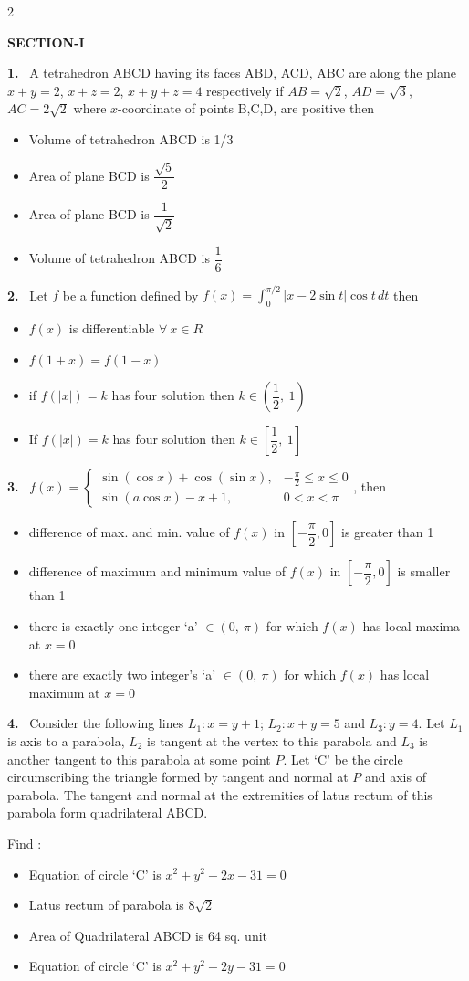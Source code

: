 \documentclass[10pt]{extarticle}
\newcommand{\partsec}[2]{\par\medskip\noindent{\large\bfseries PART-#1: #2}\par\smallskip}
\newcommand{\sect}[1]{\par\smallskip\noindent\textbf{#1}\par}
\newcommand{\qn}[1]{\par\smallskip\noindent\textbf{#1.}~}
\newenvironment{qoptions}{\begin{itemize}[leftmargin=1.8em,itemsep=1pt,topsep=2pt,label={}]}{\end{itemize}}
\newcommand{\opt}[2]{\item[(#1)] #2}
\begin{document}
\begin{multicols}{2}
\partsec{3}{MATHEMATICS}
\sect{SECTION-I}
\qn{1} A tetrahedron ABCD having its faces ABD, ACD, ABC are along the plane $x+y=2$, $x+z=2$, $x+y+z=4$ respectively if $AB=\sqrt2$, $AD=\sqrt3$, $AC=2\sqrt2$ where $x$-coordinate of points B,C,D, are positive then
\begin{qoptions}
\opt{A}{Volume of tetrahedron ABCD is 1/3}
\opt{B}{Area of plane BCD is $\dfrac{\sqrt5}{2}$}
\opt{C}{Area of plane BCD is $\dfrac{1}{\sqrt2}$}
\opt{D}{Volume of tetrahedron ABCD is $\dfrac16$}
\end{qoptions}

\qn{2} Let $f$ be a function defined by $f(x)=\displaystyle\int_0^{\pi/2}|x-2\sin t|\cos t\,dt$ then
\begin{qoptions}
\opt{A}{$f(x)$ is differentiable $\forall\ x\in R$}
\opt{B}{$f(1+x)=f(1-x)$}
\opt{C}{if $f(|x|)=k$ has four solution then $k\in\left(\dfrac12,\ 1\right)$}
\opt{D}{If $f(|x|)=k$ has four solution then $k\in\left[\dfrac12,\ 1\right]$}
\end{qoptions}

\qn{3} $f(x)=\begin{cases}\sin(\cos x)+\cos(\sin x), & -\frac{\pi}{2}\le x\le0\\ \sin(a\cos x)-x+1, & 0<x<\pi\end{cases}$, then
\begin{qoptions}
\opt{A}{difference of max. and min. value of $f(x)$ in $\left[-\dfrac{\pi}{2},0\right]$ is greater than 1}
\opt{B}{difference of maximum and minimum value of $f(x)$ in $\left[-\dfrac{\pi}{2},0\right]$ is smaller than 1}
\opt{C}{there is exactly one integer `a' $\in(0,\ \pi)$ for which $f(x)$ has local maxima at $x=0$}
\opt{D}{there are exactly two integer's `a' $\in(0,\ \pi)$ for which $f(x)$ has local maximum at $x=0$}
\end{qoptions}

\qn{4} Consider the following lines $L_1: x=y+1$; $L_2: x+y=5$ and $L_3: y=4$. Let $L_1$ is axis to a parabola, $L_2$ is tangent at the vertex to this parabola and $L_3$ is another tangent to this parabola at some point $P$. Let `C' be the circle circumscribing the triangle formed by tangent and normal at $P$ and axis of parabola. The tangent and normal at the extremities of latus rectum of this parabola form quadrilateral ABCD.

Find :
\begin{qoptions}
\opt{A}{Equation of circle `C' is $x^2+y^2-2x-31=0$}
\opt{B}{Latus rectum of parabola is $8\sqrt2$}
\opt{C}{Area of Quadrilateral ABCD is 64 sq. unit}
\opt{D}{Equation of circle `C' is $x^2+y^2-2y-31=0$}
\end{qoptions}


\end{multicols}
\end{document}
